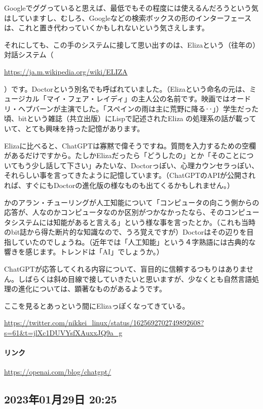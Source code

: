 \documentclass[facebook_diary.tex]{subfiles}
\begin{document}
Googleでググっていると思えば、最低でもその程度には使えるんだろうという気はしていますし、むしろ、Googleなどの検索ボックスの形のインターフェースは、これと置き代わっていくかもしれないという気さえします。


それにしても、この手のシステムに接して思い出すのは、Elizaという（往年の）対話システム（

\url{https://ja.m.wikipedia.org/wiki/ELIZA}

）です。Doctorという別名でも呼ばれていました。（Elizaという命名の元は、ミュージカル「マイ・フェア・レイディ」の主人公の名前です。映画ではオードリ・ヘプバーンが主演でした。「スペインの雨は主に荒野に降る‥」）学生だった頃、bitという雑誌（共立出版）にLispで記述されたEliza の処理系の話が載っていて、とても興味を持った記憶があります。


Elizaに比べると、ChatGPTは寡黙で偉そうですね。質問を入力するための空欄があるだけですから。たしかElizaだったら「どうしたの」とか「そのことについてもう少し話して下さい」みたいな、Doctorっぽい、心理カウンセラっぽい、それらしい事を言ってきたように記憶しています。（ChatGPTのAPIが公開されれば、すぐにもDoctorの進化版の様なものも出てくるかもしれません。）


かのアラン・チューリングが人工知能について「コンピュータの向こう側からの応答が、人なのかコンピュータなのか区別がつかなかったなら、そのコンピュータシステムには知能があると言える」という様な事を言ったとか。（これも当時のbit誌から得た断片的な知識なので、うろ覚えですが）Doctorはその辺りを目指していたのでしょうね。（近年では「人工知能」という４字熟語には古典的な響きを感じます。トレンドは「AI」でしょうか。）


ChatGPTが応答してくれる内容について、盲目的に信頼するつもりはありません。しばらくは斜め目線で接していきたいと思いますが、少なくとも自然言語処理の進化については、顕著なものがあるようです。


ここを見るとあっという間にElizaっぽくなってきている。

\url{https://twitter.com/nikkei_linux/status/1625692702749892608?s=61&t=jlXc1DUVYsfXAuxxJQ9a_g}



\paragraph{リンク}
\url{https://openai.com/blog/chatgpt/}

\subsection*{2023年01月29日 20:25}
\end{document}
